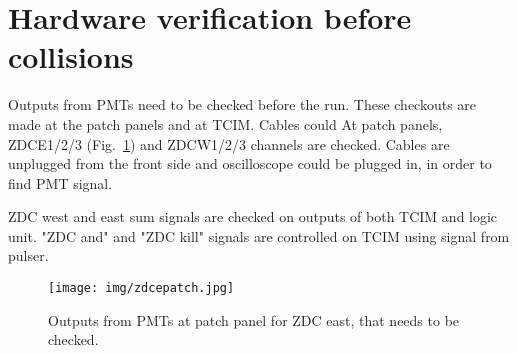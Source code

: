 \section{Hardware verification before collisions}
Outputs from PMTs need to be checked before the run. These checkouts are made at the patch panels and at TCIM. Cables could 
At patch panels, ZDCE1/2/3 (Fig.~\ref{zdcepatch}) and ZDCW1/2/3 channels are checked. Cables are unplugged from the front side and oscilloscope could be plugged in, in order to find PMT signal.

ZDC west and east sum signals are checked on outputs of both TCIM and logic unit. "ZDC and" and "ZDC kill" signals are controlled on TCIM using  signal from pulser.

\begin{figure}[htb]
\begin{center}
\texttt{[image: img/zdcepatch.jpg]}
\end{center}
\caption{Outputs from PMTs at patch panel for ZDC east, that needs to be checked.}
\label{zdcepatch}
\end{figure}




